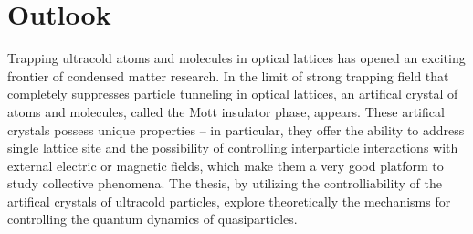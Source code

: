 \chapter{Outlook}
\label{ch:conclusion}

Trapping ultracold atoms and molecules in optical lattices has opened an exciting frontier of condensed 
matter research\cite{Baranov2012}. In the limit of strong trapping field that completely suppresses particle tunneling
in optical lattices, an artifical crystal of atoms and molecules, called the Mott insulator phase, appears. These artifical crystals possess 
unique properties -- in particular, they offer  the ability to address single lattice site\cite{atom-mott1, atom-mott2} and the possibility of controlling interparticle interactions with external electric or magnetic fields\cite{quemener2012, Baranov2012},  which make them a very good platform to
study collective phenomena\cite{our-njp-review, quemener2012, Baranov2012}. The thesis, by utilizing  the controlliability of the artifical crystals of ultracold particles, explore theoretically the mechanisms for  
controlling the quantum dynamics
of quasiparticles. 

